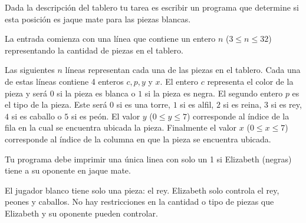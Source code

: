 \documentclass{oci}
\begin{document}
\begin{problemDescription}
\begin{center}
\scalebox{1}{\chessboard[setfen=7K/6q1/6k1/8/8/8/8/8]}
\end{center}

Dada la descripción del tablero tu tarea es escribir un programa que determine si esta posición
es jaque mate para las piezas blancas.

\end{problemDescription}

\begin{inputDescription}
La entrada comienza con una línea que contiene un entero $n$ ($ 3 \leq n
    \leq 32$) representando la cantidad de piezas en el tablero.

Las siguientes $n$ líneas representan cada una de las piezas en el tablero.
Cada una de estas líneas contiene 4 enteros $c, p, y$ y $x$.
El entero $c$ representa el color de la pieza y será 0 si la pieza es blanca o $1$
si la pieza es negra.
El segundo entero $p$ es el tipo de la pieza.
Este será $0$ si es una torre, $1$ si es alfil, $2$ si es reina, $3$ si es rey, $4$
si es caballo o $5$ si es peón.
El valor $y$ ($0\leq y \leq 7$) corresponde al índice de la fila en la cual se encuentra
ubicada la pieza.
Finalmente el valor $x$ ($0\leq x \leq 7$) corresponde al índice de la columna en que
la pieza se encuentra ubicada.
\end{inputDescription}

\begin{outputDescription}
Tu programa debe imprimir una única linea con solo un 1 si
Elizabeth (negras) tiene a su oponente en jaque mate.
\end{outputDescription}

\begin{scoreDescription}
  El jugador blanco tiene solo una pieza: el rey.
  Elizabeth solo controla el rey, peones y caballos.
  No hay restricciones en la cantidad o tipo de piezas que Elizabeth y
  su oponente pueden controlar.
\end{scoreDescription}

\begin{sampleDescription}
\end{sampleDescription}
\end{document}
